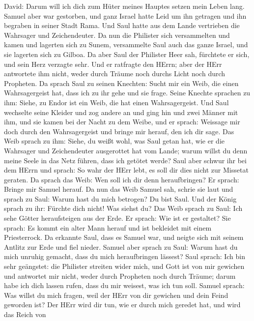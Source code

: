 David: Darum will ich dich zum Hüter meines Hauptes setzen mein Leben
lang.  Samuel aber war gestorben, und ganz Israel hatte Leid
um ihn getragen und ihn begraben in seiner Stadt Rama. Und Saul hatte
aus dem Lande vertrieben die Wahrsager und Zeichendeuter. 
Da nun die Philister sich versammelten und kamen und lagerten sich zu
Sunem, versammelte Saul auch das ganze Israel, und sie lagerten sich zu
Gilboa.  Da aber Saul der Philister Heer sah, fürchtete er
sich, und sein Herz verzagte sehr.  Und er ratfragte den
HErrn; aber der HErr antwortete ihm nicht, weder durch Träume noch
durchs Licht noch durch Propheten.  Da sprach Saul zu seinen
Knechten: Sucht mir ein Weib, die einen Wahrsagergeist hat, dass ich zu
ihr gehe und sie frage. Seine Knechte sprachen zu ihm: Siehe, zu Endor
ist ein Weib, die hat einen Wahrsagergeist.  Und Saul
wechselte seine Kleider und zog andere an und ging hin und zwei Männer
mit ihm, und sie kamen bei der Nacht zu dem Weibe, und er sprach:
Weissage mir doch durch den Wahrsagergeist und bringe mir herauf, den
ich dir sage.  Das Weib sprach zu ihm: Siehe, du weißt wohl,
was Saul getan hat, wie er die Wahrsager und Zeichendeuter ausgerottet
hat vom Lande; warum willst du denn meine Seele in das Netz führen, dass
ich getötet werde?  Saul aber schwur ihr bei dem HErrn und
sprach: So wahr der HErr lebt, es soll dir dies nicht zur Missetat
geraten.  Da sprach das Weib: Wen soll ich dir denn
heraufbringen? Er sprach: Bringe mir Samuel herauf.  Da nun
das Weib Samuel sah, schrie sie laut und sprach zu Saul: Warum hast du
mich betrogen? Du bist Saul.  Und der König sprach zu ihr:
Fürchte dich nicht! Was siehst du? Das Weib sprach zu Saul: Ich sehe
Götter heraufsteigen aus der Erde.  Er sprach: Wie ist er
gestaltet? Sie sprach: Es kommt ein alter Mann herauf und ist bekleidet
mit einem Priesterrock. Da erkannte Saul, dass es Samuel war, und neigte
sich mit seinem Antlitz zur Erde und fiel nieder.  Samuel
aber sprach zu Saul: Warum hast du mich unruhig gemacht, dass du mich
heraufbringen lässest? Saul sprach: Ich bin sehr geängstet: die
Philister streiten wider mich, und Gott ist von mir gewichen und
antwortet mir nicht, weder durch Propheten noch durch Träume; darum habe
ich dich lassen rufen, dass du mir weisest, was ich tun soll.
 Samuel sprach: Was willst du mich fragen, weil der HErr
von dir gewichen und dein Feind geworden ist?  Der HErr
wird dir tun, wie er durch mich geredet hat, und wird das Reich von
